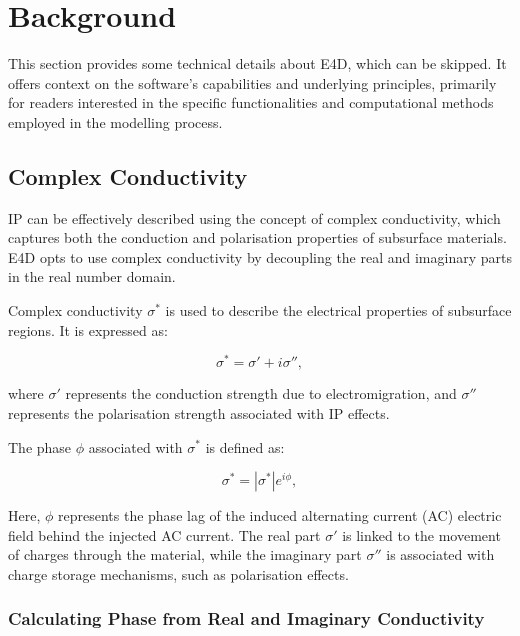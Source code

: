 \documentclass[a4paper,12pt]{article}
\begin{document}
\newpage

\section{Background}

This section provides some technical details about E4D, which can be skipped. It offers context on the software’s capabilities and underlying principles, primarily for readers interested in the specific functionalities and computational methods employed in the modelling process.

\subsection{Complex Conductivity}

IP can be effectively described using the concept of complex conductivity, which captures both the conduction and polarisation properties of subsurface materials. E4D opts to use complex conductivity by decoupling the real and imaginary parts in the real number domain.

Complex conductivity \( \sigma^* \) is used to describe the electrical properties of subsurface regions. It is expressed as:

\begin{equation}
\sigma^* = \sigma' + i\sigma'',
\end{equation}

where \( \sigma' \) represents the conduction strength due to electromigration, and \( \sigma'' \) represents the polarisation strength associated with IP effects.

The phase \( \phi \) associated with \( \sigma^* \) is defined as:

\begin{equation}
\sigma^* = |\sigma^*| e^{i\phi},
\end{equation}

Here, \( \phi \) represents the phase lag of the induced alternating current (AC) electric field behind the injected AC current. The real part \( \sigma' \) is linked to the movement of charges through the material, while the imaginary part \( \sigma'' \) is associated with charge storage mechanisms, such as polarisation effects.

\subsubsection{Calculating Phase from Real and Imaginary Conductivity}
\end{document}

